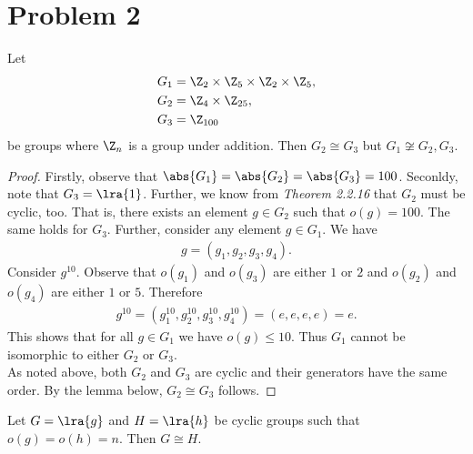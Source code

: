 \documentclass{article}
\begin{document}
\section*{Problem 2}


\begin{claim*}
    Let
    \begin{align*}
        G_1 & = \Z_2 \times \Z_5 \times \Z_2 \times \Z_5, \\
        G_2 & = \Z_4 \times \Z_{25},                      \\
        G_3 & = \Z_{100}
    \end{align*}
    be groups where $\Z_n$ is a group under addition. Then
    $G_2 \cong G_3$ but $G_1\not\cong G_2,G_3$.
\end{claim*}

\begin{proof}
    Firstly, observe that $\abs{G_1}=\abs{G_2}=\abs{G_3}=100$.
    Seconldy, note that $G_3=\lra{1}$. Further, we know from
    \emph{Theorem 2.2.16} that $G_2$ must be cyclic, too. That is,
    there exists an element $g\in G_2$ such that $o(g)=100$. The
    same holds for $G_3$. Further, consider any element $g\in G_1$.
    We have
    \begin{align*}
        g = (g_1, g_2, g_3, g_4).
    \end{align*}
    Consider $g^{10}$. Observe that $o(g_1)$ and $o(g_3)$ are either
    $1$ or $2$ and $o(g_2)$ and $o(g_4)$ are either $1$ or $5$. Therefore
    \begin{align*}
        g^{10}=(g_1^{10},g_2^{10},g_3^{10},g_4^{10})=(e,e,e,e)=e.
    \end{align*}
    This shows that for all $g\in G_1$ we have $o(g)\leq 10$. Thus
    $G_1$ cannot be isomorphic to either $G_2$ or $G_3$.\\
    \indent As noted above, both $G_2$ and $G_3$ are cyclic and their
    generators have the same order. By the lemma below, $G_2\cong G_3$
    follows.
\end{proof}


\begin{lemma*}
    Let $G=\lra{g}$ and $H=\lra{h}$ be cyclic groups such that
    $o(g)=o(h)=n$. Then $G\cong H$.
\end{lemma*}
\end{document}
